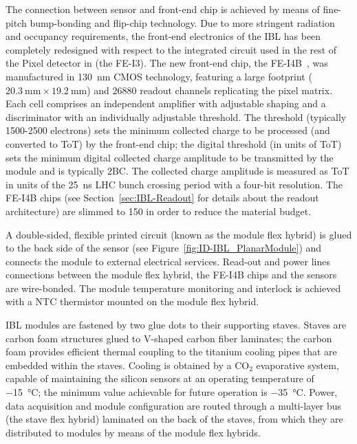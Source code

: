 \documentclass[cernpreprint, atlasdraft=false, UKenglish,british,orcidlogo, texmf, orcidlogo]{atlasdoc}
\begin{document}
The connection between sensor and front-end chip is achieved by means of fine-pitch bump-bonding and flip-chip technology.
Due to more stringent radiation and occupancy requirements, the front-end electronics of the \gls{IBL} has been completely redesigned with respect to the integrated circuit used in the rest of the Pixel detector in \RunOne (the FE-I3).
The new front-end chip, the FE-I4B~\cite{FE-I4}, was manufactured in \SI{130}{\nm} \gls{CMOS} technology, featuring a large footprint
($\SI{20.3}{\mm}\times\SI{19.2}{\mm}$)
and \num{26880} readout channels replicating the pixel matrix. Each cell comprises an independent amplifier with adjustable shaping and a discriminator with an individually adjustable threshold. The \analog threshold (typically 1500-2500 electrons) sets the minimum collected charge to be processed (and converted to \gls{ToT}) by the front-end chip; the digital threshold (in units of \gls{ToT})
sets the minimum digital collected charge amplitude to be transmitted by the module and is typically $2$\gls{BC}. The collected charge amplitude is measured as \gls{ToT} in units of the \SI{25}{\ns} \gls{LHC} bunch crossing period with a four-bit resolution.
The FE-I4B chips (see Section~\ref{sec:IBL-Readout} for details about the readout architecture) are slimmed to \SI{150}{\micron} in order to reduce the material budget.
 
A double-sided, flexible printed circuit (known as the module flex hybrid) is glued to the back side of the sensor (see Figure~\ref{fig:ID-IBL_PlanarModule}) and connects the module to external electrical services.
Read-out and power lines connections between the module flex hybrid, the FE-I4B chips and the sensors are wire-bonded.
The module temperature monitoring and interlock is achieved with a \gls{NTC} thermistor mounted on the module flex hybrid.
 
\gls{IBL} modules are fastened by two glue dots to their supporting staves. Staves are carbon foam structures glued to V-shaped carbon fiber laminates; the carbon foam provides efficient thermal coupling to the titanium cooling pipes that are embedded within the staves.
Cooling is obtained by a ${\text{CO}}_2$ evaporative system, capable of maintaining the silicon sensors at an operating temperature of \SI{-15}{\degreeCelsius}; the minimum value achievable for future operation is \SI{-35}{\degreeCelsius}. Power, data acquisition and module configuration are routed through a multi-layer bus (the stave flex hybrid) laminated on the back of the staves, from which they are distributed to modules by means of the module flex hybrids.
 
\end{document}
